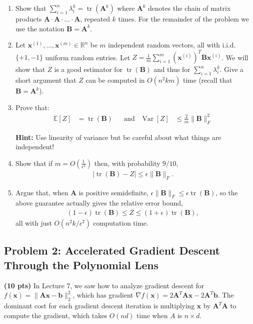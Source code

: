 \documentclass[10pt]{article}
\newcommand{\bv}[1]{\mathbf{#1}}
\newcommand{\R}{\mathbb{R}}
\newcommand{\E}{\mathbb{E}}
\DeclareMathOperator{\Var}{Var}
\DeclareMathOperator{\tr}{tr}
\begin{document}
\begin{enumerate}[label=(\alph*)]
	\item Show that $\sum_{i=1}^n\lambda_i^k = \tr(\bv{A}^k)$ where $\bv{A}^k$ denotes the chain of matrix products $\bv{A}\cdot \bv{A}\cdot\ldots\cdot \bv{A}$, repeated $k$ times.
	For the remainder of the problem we use the notation $\bv{B} = \bv{A}^k$. 
	
	\item Let $\bv{x}^{(1)}, \ldots, \bv{x}^{(m)} \in \R^n$ be $m$ independent random vectors, all with i.i.d. $\{+1,-1\}$ uniform random entries. Let $Z = \frac{1}{m}\sum_{i=1}^m (\bv{x}^{(i)})^T \bv{B}\bv{x}^{(i)}$. We will show that $Z$ is a good estimator for $\tr(\bv{B})$ and thus for $\sum_{i=1}^n\lambda_i^k$. Give a short argument that $Z$ can be computed in $O(n^2km)$ time (recall that $\bv{B} = \bv{A}^k$).  
	
	\item Prove that:
	\begin{align*}
		\E[Z] &= \tr(\bv{B}) & &\text{and} & \Var[Z] &\leq \frac{2}{m}\|\bv{B}\|_F^2
	\end{align*}

	\textbf{Hint:} Use linearity of variance but be careful about what things are independent!
	

	\item 	Show that if $m = O(\frac{1}{\epsilon^2})$ then, with probability $9/10$, 
	\begin{align*}
		|\tr(\bv{B}) -Z| \leq \epsilon \|\bv{B}\|_F.
	\end{align*}

	\item Argue that, when $\bv{A}$ is positive semidefinite, $\epsilon \|\bv{B}\|_F \leq \epsilon \tr(\bv{B})$, so the above guarantee actually gives the relative error bound, 
\begin{align*}
	(1-\epsilon)\tr(\bv{B}) \leq Z \leq (1+\epsilon)\tr(\bv{B}),
\end{align*}
all with just $O(n^2k/\epsilon^2)$ computation time. 

\end{enumerate}

\subsection{Problem 2: Accelerated Gradient Descent Through the Polynomial Lens}
\textbf{(10 pts)}
In Lecture 7, we saw how to analyze gradient descent for $f(\bv{x}) = \|\bv{A}\bv{x} - \bv{b}\|_2^2$, which has gradient $\nabla f(\bv{x}) = 2\bv{A}^T\bv{A}\bv{x} - 2\bv{A}^T\bv{b}$. The dominant cost for each gradient descent iteration is multiplying $\bv{x}$ by $\bv{A}^T\bv{A}$ to compute the gradient, which takes $O(nd)$ time when $A$ is $n\times d$. 
\end{document}
